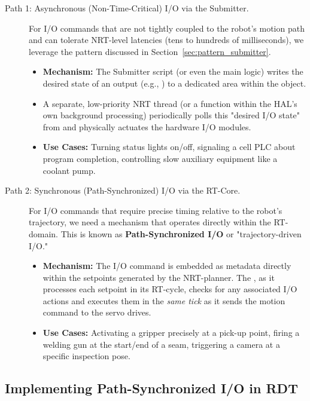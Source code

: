 \begin{description}
    \item[Path 1: Asynchronous (Non-Time-Critical) I/O via the Submitter.]
    For I/O commands that are not tightly coupled to the robot's motion path and can tolerate NRT-level latencies (tens to hundreds of milliseconds), we leverage the \textbf{} pattern discussed in Section~\ref{sec:pattern_submitter}.
    \begin{itemize}
        \item \textbf{Mechanism:} The Submitter script (or even the main  logic) writes the desired state of an output (e.g., ) to a dedicated area within the  object.
        \item A separate, low-priority NRT thread (or a function within the HAL's own background processing) periodically polls this "desired I/O state" from  and physically actuates the hardware I/O modules.
        \item \textbf{Use Cases:} Turning status lights on/off, signaling a cell PLC about program completion, controlling slow auxiliary equipment like a coolant pump.
    \end{itemize}

    \item[Path 2: Synchronous (Path-Synchronized) I/O via the RT-Core.]
    For I/O commands that require precise timing relative to the robot's trajectory, we need a mechanism that operates directly within the RT-domain. This is known as \textbf{Path-Synchronized I/O} or "trajectory-driven I/O."
    \begin{itemize}
        \item \textbf{Mechanism:} The I/O command is embedded as metadata directly within the  setpoints generated by the NRT-planner. The , as it processes each setpoint in its RT-cycle, checks for any associated I/O actions and executes them in the \textit{same tick} as it sends the motion command to the servo drives.
        \item \textbf{Use Cases:} Activating a gripper precisely at a pick-up point, firing a welding gun at the start/end of a seam, triggering a camera at a specific inspection pose.
    \end{itemize}
\end{description}

\subsection{Implementing Path-Synchronized I/O in RDT}
\label{subsec:path_sync_io_rdt}

